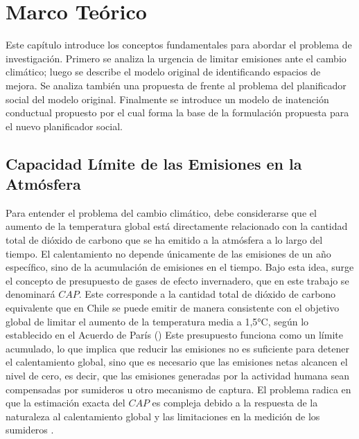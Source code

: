 
\chapter{Marco Teórico}
\label{c2} 

Este capítulo introduce los conceptos fundamentales para abordar el problema de investigación. Primero se analiza la urgencia de limitar emisiones ante el cambio climático; luego se describe el modelo original de  identificando espacios de mejora. Se analiza también una propuesta de  frente al problema del planificador social del modelo original. Finalmente se introduce un modelo de inatención conductual propuesto por  el cual forma la base de la formulación propuesta para el nuevo planificador social. \medskip

\section{Capacidad Límite de las Emisiones en la Atmósfera}
Para entender el problema del cambio climático, debe considerarse que el aumento de la temperatura global está directamente relacionado con la cantidad total de dióxido de carbono que se ha emitido a la atmósfera a lo largo del tiempo. El calentamiento no depende únicamente de las emisiones de un año específico, sino de la acumulación de emisiones en el tiempo. Bajo esta idea, surge el concepto de presupuesto de gases de efecto invernadero, que en este trabajo se denominará $CAP$. Este corresponde a la cantidad total de dióxido de carbono equivalente que en Chile se puede emitir de manera consistente con el objetivo global de limitar el aumento de la temperatura media a 1,5°C, según lo establecido en el Acuerdo de París () Este presupuesto funciona como un límite acumulado, lo que implica que reducir las emisiones no es suficiente para detener el calentamiento global, sino que es necesario que las emisiones netas alcancen el nivel de cero, es decir, que las emisiones generadas por la actividad humana sean compensadas por sumideros u otro mecanismo de captura. El problema radica en que la estimación exacta del $CAP$ es compleja debido a la respuesta de la naturaleza al calentamiento global y las limitaciones en la medición de los sumideros \cite{sophie_berger_francebelgium_sarah_l_connors_franceunited_kingdom_frequently_2026}. \medskip

